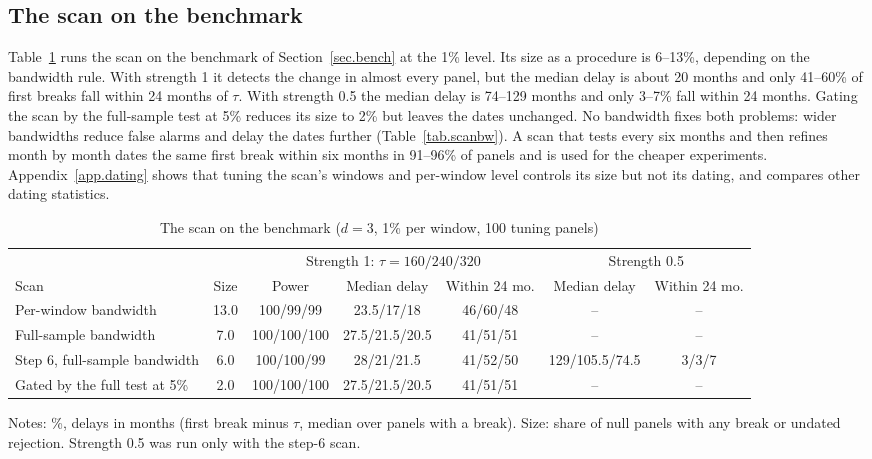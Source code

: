 \documentclass[11pt]{article}
\begin{document}
\subsection{The scan on the benchmark}\label{sec.scanbench}

Table~\ref{tab.scanbench} runs the scan on the benchmark of Section~\ref{sec.bench} at the 1\% level. Its size as a procedure is 6--13\%, depending on the bandwidth rule. With strength 1 it detects the change in almost every panel, but the median delay is about 20 months and only 41--60\% of first breaks fall within 24 months of $\tau$. With strength 0.5 the median delay is 74--129 months and only 3--7\% fall within 24 months. Gating the scan by the full-sample test at 5\% reduces its size to 2\% but leaves the dates unchanged. No bandwidth fixes both problems: wider bandwidths reduce false alarms and delay the dates further (Table~\ref{tab.scanbw}). A scan that tests every six months and then refines month by month dates the same first break within six months in 91--96\% of panels and is used for the cheaper experiments. Appendix~\ref{app.dating} shows that tuning the scan's windows and per-window level controls its size but not its dating, and compares other dating statistics.

\begin{table}[htbp]
\centering
\footnotesize
\begin{threeparttable}
\caption{The scan on the benchmark ($d=3$, 1\% per window, 100 tuning panels)}\label{tab.scanbench}
\setlength{\tabcolsep}{4pt}
\begin{tabular}{lcccccc}
\toprule
 & & \multicolumn{3}{c}{Strength 1: $\tau=160/240/320$} & \multicolumn{2}{c}{Strength 0.5}\\
\cmidrule(lr){3-5}\cmidrule(lr){6-7}
Scan & Size & Power & Median delay & Within 24 mo. & Median delay & Within 24 mo.\\
\midrule
Per-window bandwidth & 13.0 & 100/99/99 & 23.5/17/18 & 46/60/48 & -- & --\\
Full-sample bandwidth & 7.0 & 100/100/100 & 27.5/21.5/20.5 & 41/51/51 & -- & --\\
Step 6, full-sample bandwidth & 6.0 & 100/100/99 & 28/21/21.5 & 41/52/50 & 129/105.5/74.5 & 3/3/7\\
Gated by the full test at 5\% & 2.0 & 100/100/100 & 27.5/21.5/20.5 & 41/51/51 & -- & --\\
\bottomrule
\end{tabular}
\begin{tablenotes}\small
\item Notes: \%, delays in months (first break minus $\tau$, median over panels with a break). Size: share of null panels with any break or undated rejection. Strength 0.5 was run only with the step-6 scan.
\end{tablenotes}
\end{threeparttable}
\end{table}
\end{document}
